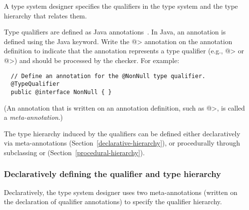 A type system designer specifies the qualifiers in the type system and
the type hierarchy that relates them.


Type qualifiers are defined as Java annotations~\cite{JSR269}.  In Java, an
annotation is defined using the Java  keyword.
Write the \<@> annotation on the annotation definition
to indicate that the annotation represents a type qualifier (e.g.,
\<@> or \<@>) and should be processed by the checker.  For example:

\begin{Verbatim}
  // Define an annotation for the @NonNull type qualifier.
  @TypeQualifier
  public @interface NonNull { }
\end{Verbatim}

\noindent
(An annotation that is written on an annotation
definition, such as \<@>, is called a \emph{meta-annotation}.)


The type hierarchy induced by the qualifiers can be defined either
declaratively via meta-annotations (Section~\ref{declarative-hierarchy}), or procedurally through
subclassing  or
 (Section~\ref{procedural-hierarchy}).


\subsubsection{Declaratively defining the qualifier and type hierarchy\label{declarative-hierarchy}}

Declaratively, the type system designer uses two meta-annotations (written
on the declaration of qualifier annotations) to specify the qualifier
hierarchy.

